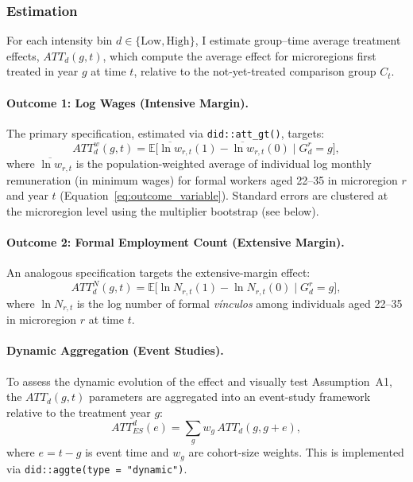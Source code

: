 \subsubsection{Estimation}
\label{sec:estimation_equations}

For each intensity bin $d \in \{\text{Low}, \text{High}\}$, I estimate group--time average treatment effects, $ATT_d(g,t)$, which compute the average effect for microregions first treated in year $g$ at time $t$, relative to the not-yet-treated comparison group $C_t$.

\paragraph{Outcome 1: Log Wages (Intensive Margin).}
The primary specification, estimated via \texttt{did::att\_gt()}, targets:
\begin{equation}
    ATT_d^w(g, t) = \mathbb{E}\bigl[\overline{\ln w}_{r,t}(1) - \overline{\ln w}_{r,t}(0) \mid G_d^r = g\bigr],
    \label{eq:main_wages}
\end{equation}
where $\overline{\ln w}_{r,t}$ is the population-weighted average of individual log monthly remuneration (in minimum wages) for formal workers aged 22--35 in microregion $r$ and year $t$ (Equation~\ref{eq:outcome_variable}). Standard errors are clustered at the microregion level using the multiplier bootstrap (see below).

\paragraph{Outcome 2: Formal Employment Count (Extensive Margin).}
An analogous specification targets the extensive-margin effect:
\begin{equation}
    ATT_d^N(g, t) = \mathbb{E}\bigl[\ln N_{r,t}(1) - \ln N_{r,t}(0) \mid G_d^r = g\bigr],
    \label{eq:main_employment}
\end{equation}
where $\ln N_{r,t}$ is the log number of formal \emph{vínculos} among individuals aged 22--35 in microregion $r$ at time $t$.

\paragraph{Dynamic Aggregation (Event Studies).}
To assess the dynamic evolution of the effect and visually test Assumption~A1, the $ATT_d(g,t)$ parameters are aggregated into an event-study framework relative to the treatment year $g$:
\begin{equation}
    ATT_{ES}^d(e) = \sum_{g} w_g \, ATT_d(g, g + e),
    \label{eq:event_study}
\end{equation}
where $e = t - g$ is event time and $w_g$ are cohort-size weights. This is implemented via \texttt{did::aggte(type = "dynamic")}.

